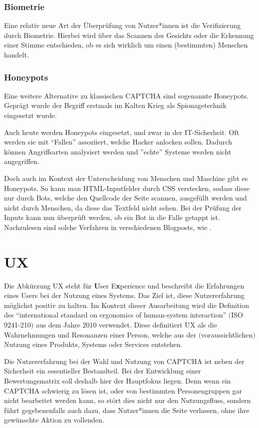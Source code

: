 \subsubsection*{Biometrie}
Eine relativ neue Art der Überprüfung von Nutzer*innen ist die Verifizierung durch Biometrie.
Hierbei wird über das Scannen des Gesichts oder die Erkennung einer Stimme entschieden, ob es sich wirklich um einen (bestimmten) Menschen handelt.
\cite{rtcaptcha}
\subsubsection*{Honeypots}
Eine weitere Alternative zu klassischen CAPTCHA sind sogenannte Honeypots. 
Geprägt wurde der Begriff erstmals im Kalten Krieg als Spionagetechnik eingesetzt wurde. \cite[p.2]{joshi:2011} 

Auch heute werden Honeypots eingesetzt, und zwar in der IT-Sicherheit. 
Oft werden sie mit ``Fallen'' assoziiert, welche Hacker anlocken sollen. 
Dadurch können Angriffsarten analysiert werden und ''echte'' Systeme werden nicht angegriffen.

Doch auch im Kontext der Unterscheidung von Menschen und Maschine gibt es Honeypots. 
So kann man HTML-Inputfelder durch CSS verstecken, sodass diese nur durch Bots, welche den Quellcode der Seite scannen, ausgefüllt werden 
und nicht durch Menschen, da diese das Textfeld nicht sehen. 
Bei der Prüfung der Inputs kann nun überprüft werden, ob ein Bot in die Falle getappt ist. 
Nachzulesen sind solche Verfahren in verschiedenen Blogposts, wie \cite{perry:2019}.

\section{UX}

Die Abkürzung UX steht für \textbf{U}ser E\textbf{x}perience und beschreibt die Erfahrungen eines Users bei der Nutzung eines Systems. 
Das Ziel ist, diese Nutzererfahrung möglichst positiv zu halten. 
Im Kontext dieser Ausarbeitung wird die Definition des  ``international standard on ergonomics of human-system interaction'' $($ISO 9241-210$)$
aus dem Jahre 2010 verwendet. 
Diese definitiert UX als die Wahrnehmungen und Resonanzen einer Person, 
welche aus der $($voraussichtlichen$)$ Nutzung eines Produkts, Systems oder Services entstehen. \cite[p.1629]{berni_borgianni_2021}

Die Nutzererfahrung bei der Wahl und Nutzung von CAPTCHA ist neben der Sicherheit ein essentieller Bestandteil.
Bei der Entwicklung einer Bewertungsmatrix soll deshalb hier der Hauptfokus liegen.
Denn wenn ein CAPTCHA schwierig zu lösen ist, oder von bestimmten Personengruppen gar nicht bearbeitet werden kann, so stört dies nicht nur den Nutzungsfluss,
sondern führt gegebenenfalls auch dazu, dass Nutzer*innen die Seite verlassen, ohne ihre gewünschte Aktion zu vollenden. 

